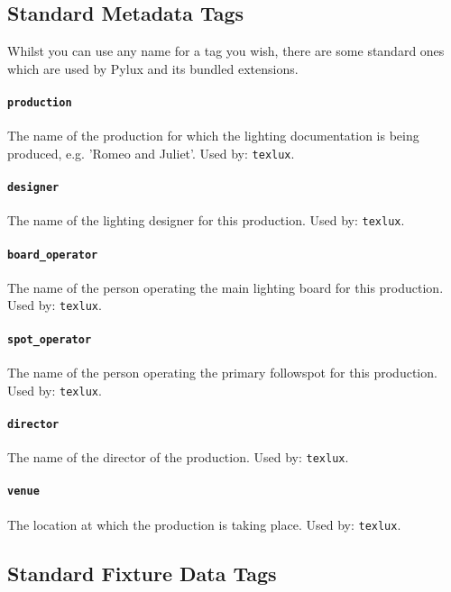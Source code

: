 \documentclass[a4paper]{article}
\begin{document}
\subsection{Standard Metadata Tags}
Whilst you can use any name for a tag you wish, there are some standard ones 
which are used by Pylux and its bundled extensions.

\paragraph{\texttt{production}}
The name of the production for which the lighting documentation is being 
produced, e.g. 'Romeo and Juliet'. Used by: \texttt{texlux}.

\paragraph{\texttt{designer}}
The name of the lighting designer for this production. Used by: 
\texttt{texlux}.

\paragraph{\texttt{board\_operator}}
The name of the person operating the main lighting board for this production.
Used by: \texttt{texlux}.

\paragraph{\texttt{spot\_operator}}
The name of the person operating the primary followspot for this production.
Used by: \texttt{texlux}.

\paragraph{\texttt{director}}
The name of the director of the production. Used by: \texttt{texlux}.

\paragraph{\texttt{venue}}
The location at which the production is taking place. Used by: 
\texttt{texlux}.

\subsection{Standard Fixture Data Tags} \label{sec:fixtags}
\end{document}
